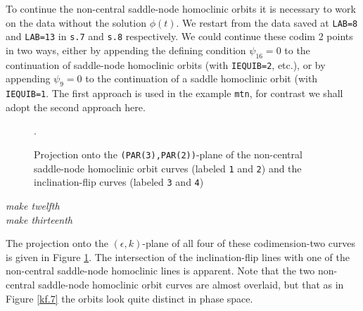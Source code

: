 \documentclass[12pt]{report}
\def\eps{\epsilon}
\begin{document}
To continue the non-central saddle-node homoclinic orbits it is
necessary to work on the data without the solution $\phi(t)$. We
restart from the data saved at {\tt LAB=8} and {\tt LAB=13} in
{\tt s.7} and {\tt s.8} respectively. We could continue these codim 2 points in two
ways, either by appending the defining condition $\psi_{16} =0$ to
the continuation of saddle-node homoclinic orbits (with {\tt IEQUIB=2},
etc.), or by appending $\psi_{9} =0$ to the continuation 
of a saddle homoclinic orbit (with {\tt IEQUIB=1}. 
The first approach is used in the example {\tt mtn},  
for contrast we shall adopt the second approach here.
\begin{figure}[p]
\epsfysize 9.0cm
\centerline{}
\caption{Projection onto the {\tt (PAR(3),PAR(2))}-plane of the non-central
saddle-node homoclinic orbit curves (labeled {\tt 1} and {\tt 2}) and the 
inclination-flip curves (labeled {\tt 3} and {\tt 4})}.
\label{kp.10}
\end{figure}
%
\begin{center}
{\it make twelfth}\\
{\it make thirteenth}
\end{center}
The projection onto the $(\eps,k)$-plane of all four of these
codimension-two curves is given in Figure \ref{kp.10}. 
The intersection of the inclination-flip lines with one of the
non-central saddle-node homoclinic lines is apparent. Note that the two
non-central saddle-node homoclinic orbit curves are almost overlaid, but
that as in Figure \ref{kf.7} the orbits look quite distinct in phase space.
\end{document}

